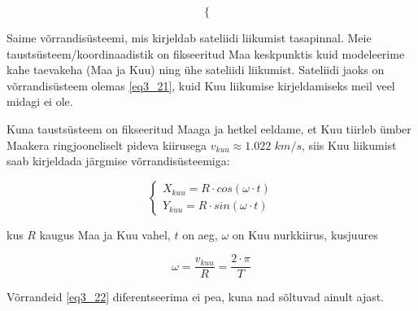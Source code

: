 \begin{flushleft}
\begin{equation}
\begin{cases}
\end{cases}
\end{equation}

Saime võrrandisüsteemi, mis kirjeldab sateliidi liikumist  tasapinnal. Meie taustsüsteem/koordinaadistik on fikseeritud Maa keskpunktis kuid modeleerime kahe taevakeha (Maa ja Kuu) ning ühe sateliidi liikumist. Sateliidi jaoks on võrrandisüsteem olemas \ref{eq3_21}, kuid Kuu liikumise kirjeldamiseks meil veel midagi ei ole.

\vspace{5mm}
Kuna taustsüsteem on fikseeritud Maaga ja hetkel eeldame, et Kuu tiirleb ümber Maakera ringjooneliselt pideva kiirusega $v_{kuu}\approx 1.022$ $km/s$, siis Kuu liikumist saab kirjeldada järgmise võrrandisüsteemiga:

\begin{equation}
\label{eq3_22}
\begin{cases}
X_{kuu}=R\cdot cos(\omega \cdot t)\\
Y_{kuu} = R \cdot sin(\omega \cdot t)
\end{cases}
\end{equation}

kus $R$ kaugus Maa ja Kuu vahel, $t$ on aeg, $\omega$ on Kuu nurkkiirus, kusjuures

\begin{equation}
\label{eq3_23}
\omega=\dfrac{v_{kuu}}{R} = \dfrac{2 \cdot \pi}{T}
\end{equation}

Võrrandeid \ref{eq3_22} diferentseerima ei pea, kuna nad sõltuvad ainult ajast.
\end{flushleft}